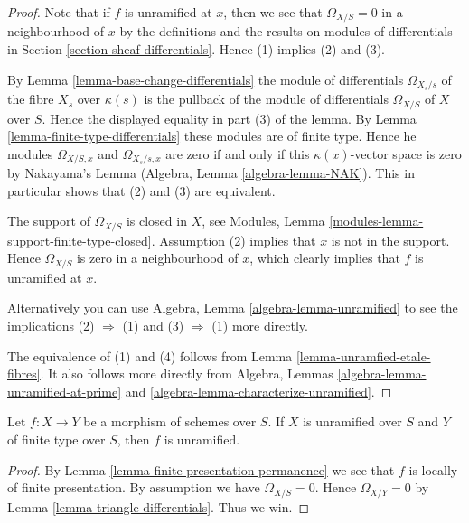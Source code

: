 \begin{proof}
Note that if $f$ is unramified at $x$, then
we see that $\Omega_{X/S} = 0$ in a neighbourhood of $x$
by the definitions and the results on modules of differentials
in Section \ref{section-sheaf-differentials}. Hence (1) implies
(2) and (3).

\medskip\noindent
By Lemma \ref{lemma-base-change-differentials}
the module of differentials $\Omega_{X_s/s}$ of the fibre $X_s$
over $\kappa(s)$ is the pullback of the module of differentials
$\Omega_{X/S}$ of $X$ over $S$. Hence the displayed equality in
part (3) of the lemma. By Lemma \ref{lemma-finite-type-differentials}
these modules are of finite type. Hence he modules
$\Omega_{X/S, x}$ and $\Omega_{X_s/s, x}$ are zero if and only
if this $\kappa(x)$-vector space is zero by Nakayama's Lemma
(Algebra, Lemma \ref{algebra-lemma-NAK}). This in particular shows that
(2) and (3) are equivalent.

\medskip\noindent
The support of $\Omega_{X/S}$ is closed in $X$, see
Modules, Lemma \ref{modules-lemma-support-finite-type-closed}.
Assumption (2) implies that $x$ is not in the support.
Hence $\Omega_{X/S}$ is zero in a neighbourhood of $x$, which
clearly implies that $f$ is unramified at $x$.

\medskip\noindent
Alternatively you can use Algebra, Lemma \ref{algebra-lemma-unramified}
to see the implications (2) $\Rightarrow$ (1) and (3) $\Rightarrow$ (1)
more directly.

\medskip\noindent
The equivalence of (1) and (4) follows from Lemma
\ref{lemma-unramfied-etale-fibres}.
It also follows more directly from
Algebra, Lemmas \ref{algebra-lemma-unramified-at-prime} and
\ref{algebra-lemma-characterize-unramified}.
\end{proof}

\begin{lemma}
\label{lemma-unramified-permanence}
Let $f : X \to Y$ be a morphism of schemes over $S$.
If $X$ is unramified over $S$ and $Y$ of finite type over $S$, then
$f$ is unramified.
\end{lemma}

\begin{proof}
By Lemma \ref{lemma-finite-presentation-permanence} we see that
$f$ is locally of finite presentation.
By assumption we have $\Omega_{X/S} = 0$. Hence
$\Omega_{X/Y} = 0$ by Lemma \ref{lemma-triangle-differentials}. Thus we win.
\end{proof}













